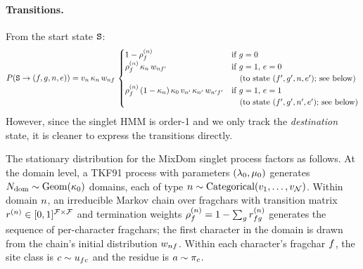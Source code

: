 \paragraph{Transitions.}
From the start state ${\tt S}$:
\begin{equation}
\label{eq:singlet-start}
P({\tt S} \to (f, g, n, e)) = v_n\, \kappa_n\, w_{nf}\,
\begin{cases}
1 - \rho^{(n)}_f & \text{if } g = 0 \\
\rho^{(n)}_f\, \kappa_n\, w_{nf'} & \text{if } g = 1,\, e = 0 \\
& \quad\text{(to state $(f', g', n, e')$; see below)} \\
\rho^{(n)}_f\,(1-\kappa_n)\, \kappa_0\, v_{n'}\, \kappa_{n'}\, w_{n'f'} & \text{if } g = 1,\, e = 1 \\
& \quad\text{(to state $(f', g', n', e')$; see below)}
\end{cases}
\end{equation}
However, since the singlet HMM is order-1 and we only track the \emph{destination} state,
it is cleaner to express the transitions directly.

The stationary distribution for the MixDom singlet process factors as
follows. At the domain level, a TKF91 process with parameters
$(\lambda_0, \mu_0)$ generates
$N_{\rm dom} \sim \mathrm{Geom}(\kappa_0)$ domains, each of type
$n \sim {\mbox{Categorical}}(v_1,\ldots,v_{\mathcal{N}})$. Within domain
$n$, an irreducible Markov chain over fragchars with transition
matrix $r^{(n)} \in [0, 1]^{\mathcal{F} \times \mathcal{F}}$ and
termination weights
$\rho^{(n)}_f = 1 - \sum_g r^{(n)}_{fg}$
generates the sequence of per-character fragchars; the first character
in the domain is drawn from the chain's initial distribution
$w_{nf}$. Within each character's fragchar
$f$, the site class is $c \sim u_{fc}$
and the residue is $a \sim \pi_c$.

